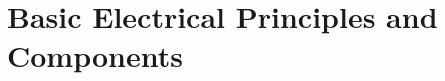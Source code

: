 \documentclass[12pt]{book}
\begin{document}
% 
% 
% 
% 
% 
% 
% 
% 
% 
% 
% 
% 
% 

\part{Basic Electrical Principles and Components}
\end{document}
